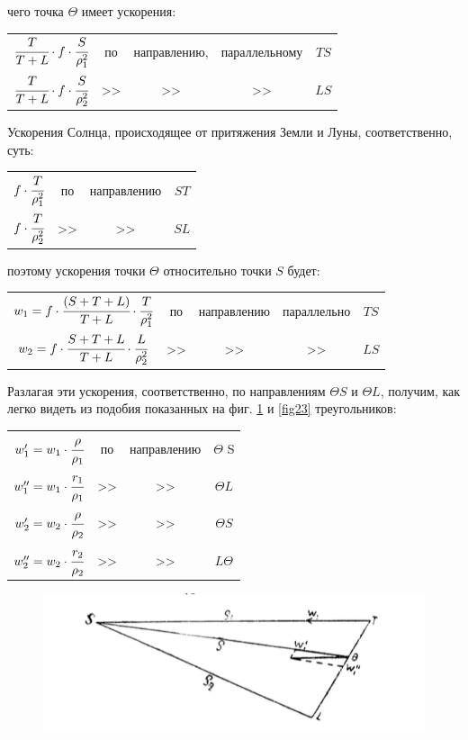 \documentclass[a4paper,12pt]{article}
\begin{document}
	\noindent  чего точка $\Theta$ имеет ускорения:
	\newpage
	\begin{table}[!h]
		\centering
		\begin{tabular}{rcccc}
			$\cfrac{T}{T+L} \cdot f \cdot \cfrac{S}{\rho_1^2}$ & по & направлению, & параллельному & $TS$ \\[5mm]
			$\cfrac{T}{T+L} \cdot f \cdot \cfrac{S}{\rho_2^2}$ & >> & >> & >> & $LS$
		\end{tabular}
	\end{table}

	Ускорения Солнца, происходящее от притяжения Земли и Луны, соответственно, суть:
	\begin{table}[!h]
		\centering
		\begin{tabular}{cccc}
			$f \cdot \cfrac{T}{\rho_1^2}$ & по & направлению & $ST$ \\[5mm]
			$f \cdot \cfrac{T}{\rho_2^2}$ & >> & >> & $SL$ \\			
		\end{tabular}
	\end{table}
	
	\noindent поэтому ускорения точки $\Theta$ относительно точки $S$ будет:
	\begin{table}[!h]
		\centering
		\begin{tabular}{ccccc}
			$w_1 = f \cdot \cfrac{(S + T + L)}{T + L} \cdot \cfrac{T}{\rho_1^2}$ & по & направлению & параллельно & $TS$ \\[5mm]
			$w_2 = f \cdot \cfrac{S+T+L}{T+L} \cdot \cfrac{L}{\rho_2^2}$ & >> & >>		   & >>			 & $LS$
		\end{tabular}
	\end{table}
	
	\noindent Разлагая эти ускорения, соответственно, по направлениям $\Theta S$ и $\Theta L$, получим, как легко видеть из подобия показанных на фиг. \ref{fig22} и \ref{fig23} треугольников:
	\begin{table}[!h]
		\centering
		\begin{tabular}{cccc}
			$w_1 ' = w_1 \cdot \cfrac{\rho}{\rho_1}$ & по & направлению & $\Theta$ S \\[5mm]
			$w_1 '' = w_1 \cdot \cfrac{r_1}{\rho_1}$ & >> & >> & $\Theta L$ \\[5mm]
			$w_2 ' = w_2 \cdot \cfrac{\rho}{\rho_2}$ & >> & >> & $\Theta S$ \\[5mm]
			$w_2 '' = w_2 \cdot \cfrac{r_2}{\rho_2}$ & >> & >> & $L \Theta$
		\end{tabular}
	\end{table}
	\begin{figure}[!h]
		\centering
		\label{fig22}
		\caption{}
		\includegraphics[width=0.6\linewidth]{fig22}
	\end{figure}
\end{document}
